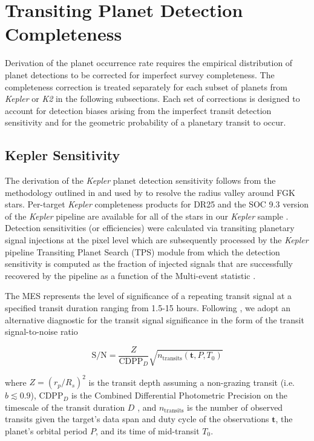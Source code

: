 \documentclass[twocolumn]{emulateapj}
\newcommand{\kepler}[1]{\emph{Kepler}#1}
\newcommand{\ktwo}[1]{\emph{K2}#1}
\begin{document}
\section{Transiting Planet Detection Completeness}  \label{sect:completeness}
Derivation of the planet occurrence rate requires the empirical distribution of planet detections to be corrected
for imperfect survey completeness. The completeness correction is treated separately for each subset
of planets from \kepler{} or \ktwo{} in the following subsections. Each set of corrections is designed to account
for detection biases arising from the imperfect transit detection sensitivity and for the 
geometric probability of a planetary transit to occur.

\subsection{Kepler Sensitivity} \label{sect:kepsens}
The derivation of the \kepler{} planet detection sensitivity follows from the methodology outlined in
\cite{christiansen16} and used by \cite{fulton17} to resolve the radius valley around FGK stars. Per-target
\kepler{} completeness products for DR25 and the SOC 9.3 version of the \kepler{} pipeline
\citep{jenkins10} are available
for all of the stars in our \kepler{} sample \citep{burke15,burke17}. Detection sensitivities
(or efficiencies) were calculated via transiting planetary signal injections at the pixel level
which are subsequently processed by the \kepler{} pipeline Transiting Planet Search (TPS) module from
which the detection sensitivity is computed as the fraction of
injected signals that are successfully recovered by the pipeline as a function of the Multi-event statistic
\citep[MES;][]{christiansen15,christiansen17}.

The MES represents the level of significance of a repeating transit signal at a specified transit duration ranging
from 1.5-15 hours. Following \cite{petigura18}, we adopt an alternative diagnostic for the transit signal significance
in the form of the transit signal-to-noise ratio

\begin{equation}
  \text{S/N} = \frac{Z}{\text{CDPP}_D} \sqrt{n_{\text{transits}}(\mathbf{t},P,T_0)}  \label{eq:snr}
\end{equation}

\noindent where $Z=(r_p/R_s)^2$ is the transit depth assuming a non-grazing transit (i.e. $b\lesssim 0.9$),
CDPP$_D$ is the Combined Differential Photometric
Precision on the timescale of the transit duration $D$ \citep{koch10}, and $n_{\text{transits}}$ is the number of
observed transits given the target's data span and duty cycle
of the observations $\mathbf{t}$, the planet's orbital period $P$, and its time of mid-transit $T_0$.
\end{document}
